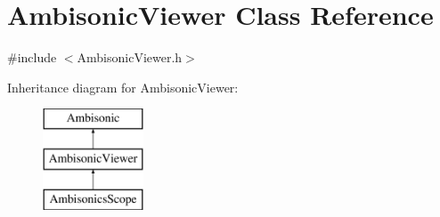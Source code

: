 \hypertarget{class_ambisonic_viewer}{\section{Ambisonic\-Viewer Class Reference}
\label{class_ambisonic_viewer}
}


{\ttfamily \#include $<$Ambisonic\-Viewer.\-h$>$}

Inheritance diagram for Ambisonic\-Viewer\-:\begin{figure}[H]
\begin{center}
\leavevmode
\includegraphics[height=3.000000cm]{class_ambisonic_viewer}
\end{center}
\end{figure}
